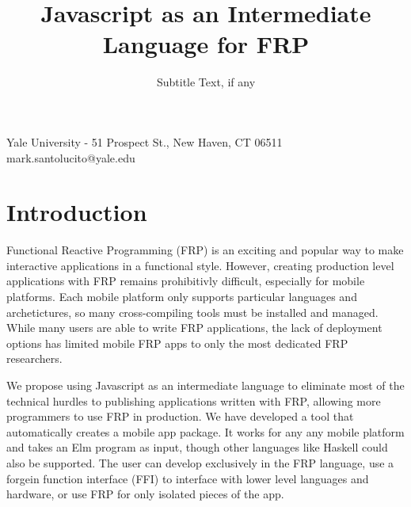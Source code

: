 \documentclass[preprint]{sigplanconf}
\begin{document}
\setlength{\pdfpageheight}{\paperheight}
\setlength{\pdfpagewidth}{\paperwidth}






\title{Javascript as an Intermediate Language for FRP}
\subtitle{Subtitle Text, if any}

           {Yale University - 51 Prospect St., New Haven, CT 06511}
           {mark.santolucito@yale.edu}

\maketitle

\section{Introduction}

Functional Reactive Programming (FRP) is an exciting and popular way to make interactive applications in a functional style.
However, creating production level applications with FRP remains prohibitivly difficult, especially for mobile platforms.
Each mobile platform only supports particular languages and archetictures, so many cross-compiling tools must be installed and managed.
While many users are able to write FRP applications, the lack of deployment options has limited mobile FRP apps to only the most dedicated FRP researchers.

We propose using Javascript as an intermediate language to eliminate most of the technical hurdles to publishing applications written with FRP, allowing more programmers to use FRP in production.
We have developed a tool that automatically creates a mobile app package.
It works for any any mobile platform and takes an Elm program as input, though other languages like Haskell could also be supported.
The user can develop exclusively in the FRP language, use a forgein function interface (FFI) to interface with lower level languages and hardware, or use FRP for only isolated pieces of the app.
\end{document}
